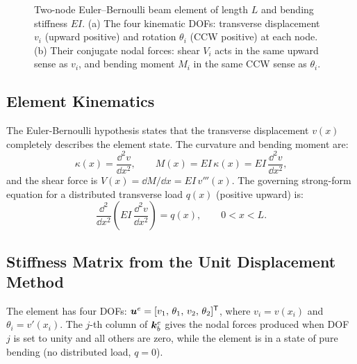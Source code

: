 \begin{figure}[htbp]
\caption{Two-node Euler--Bernoulli beam element of length $L$ and bending
stiffness $EI$. (a) The four kinematic DOFs: transverse displacement
$v_i$ (upward positive) and rotation $\theta_i$ (CCW positive) at each
node. (b) Their conjugate nodal forces: shear $V_i$ acts in the same
upward sense as $v_i$, and bending moment $M_i$ in the same CCW sense
as $\theta_i$.}
\label{fig:beam_element}
\end{figure}

\subsection{Element Kinematics}

The Euler-Bernoulli hypothesis states that the transverse displacement $v(x)$
completely describes the element state. The curvature and bending moment are:
\begin{equation}
    \kappa(x) = \frac{\dd^2 v}{\dd x^2}, \qquad
    M(x)      = EI\,\kappa(x) = EI\,\frac{\dd^2 v}{\dd x^2} ,
    \label{eq:beam_curvature}
\end{equation}
and the shear force is $V(x) = \dd M/\dd x = EI\,v'''(x)$.
The governing strong-form equation for a distributed transverse load $q(x)$
(positive upward) is:
\begin{equation}
    \frac{\dd^2}{\dd x^2}\!\left(EI\,\frac{\dd^2 v}{\dd x^2}\right) = q(x),
    \qquad 0 < x < L .
    \label{eq:beam_de}
\end{equation}

\subsection{Stiffness Matrix from the Unit Displacement Method}

The element has four DOFs:
$\bm{u}^e = [v_1,\,\theta_1,\,v_2,\,\theta_2]^{\mathsf{T}}$,
where $v_i = v(x_i)$ and $\theta_i = v'(x_i)$.
The $j$-th column of $\bm{k}^e_b$ gives the nodal forces produced when DOF~$j$
is set to unity and all others are zero, while the element is in a state of
pure bending (no distributed load, $q=0$).


